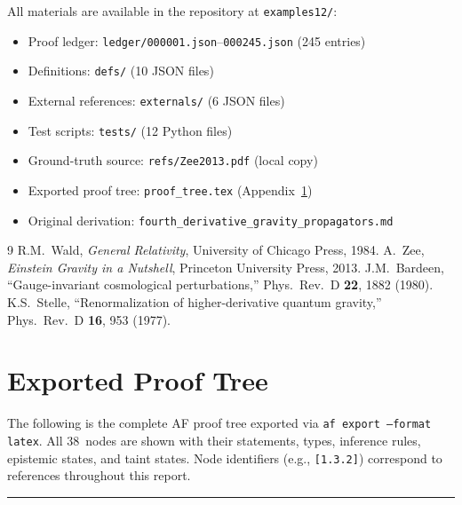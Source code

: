 \documentclass[11pt,a4paper]{article}
\newcommand{\afnode}[1]{\texttt{[#1]}}
\begin{document}
All materials are available in the repository at
\texttt{examples12/}:
\begin{itemize}
\item Proof ledger: \texttt{ledger/000001.json}--\texttt{000245.json} (245 entries)
\item Definitions: \texttt{defs/} (10 JSON files)
\item External references: \texttt{externals/} (6 JSON files)
\item Test scripts: \texttt{tests/} (12 Python files)
\item Ground-truth source: \texttt{refs/Zee2013.pdf} (local copy)
\item Exported proof tree: \texttt{proof\_tree.tex} (Appendix~\ref{app:tree})
\item Original derivation: \texttt{fourth\_derivative\_gravity\_propagators.md}
\end{itemize}

\begin{thebibliography}{9}
 R.M.~Wald, \textit{General Relativity},
  University of Chicago Press, 1984.
 A.~Zee, \textit{Einstein Gravity in a Nutshell},
  Princeton University Press, 2013.
 J.M.~Bardeen, ``Gauge-invariant cosmological perturbations,''
  Phys.\ Rev.\ D \textbf{22}, 1882 (1980).
 K.S.~Stelle, ``Renormalization of higher-derivative quantum gravity,''
  Phys.\ Rev.\ D \textbf{16}, 953 (1977).
\end{thebibliography}

\appendix
\section{Exported Proof Tree}
\label{app:tree}

The following is the complete AF proof tree exported via
\texttt{af export --format latex}. All 38~nodes are shown with their
statements, types, inference rules, epistemic states, and taint states.
Node identifiers (e.g., \afnode{1.3.2}) correspond to references throughout
this report.

\bigskip
\hrule
\bigskip


\end{document}
